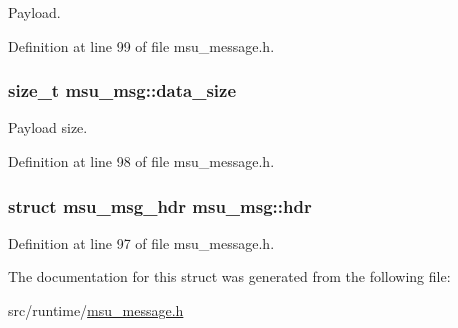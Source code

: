 Payload. 



Definition at line 99 of file msu\-\_\-message.\-h.

\hypertarget{structmsu__msg_ad6dbac0bebca6dacb6cc2b1157d114ba}{
\subsubsection[{data\-\_\-size}]{\setlength{\rightskip}{0pt plus 5cm}size\-\_\-t msu\-\_\-msg\-::data\-\_\-size}}\label{structmsu__msg_ad6dbac0bebca6dacb6cc2b1157d114ba}


Payload size. 



Definition at line 98 of file msu\-\_\-message.\-h.

\hypertarget{structmsu__msg_a3c0177321a542571240821c2350ba424}{
\subsubsection[{hdr}]{\setlength{\rightskip}{0pt plus 5cm}struct {\bf msu\-\_\-msg\-\_\-hdr} msu\-\_\-msg\-::hdr}}\label{structmsu__msg_a3c0177321a542571240821c2350ba424}


Definition at line 97 of file msu\-\_\-message.\-h.



The documentation for this struct was generated from the following file\-:\begin{DoxyCompactItemize}
\item 
src/runtime/\hyperlink{msu__message_8h}{msu\-\_\-message.\-h}\end{DoxyCompactItemize}
